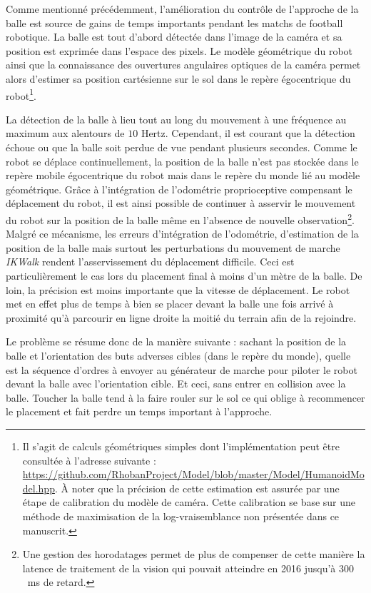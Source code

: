 Comme mentionné précédemment, l'amélioration du contrôle de l'approche 
de la balle est source de gains de temps importants pendant les
matchs de football robotique.
La balle est tout d'abord détectée dans l'image de la caméra 
et sa position est exprimée dans l'espace des pixels.
Le modèle géométrique du robot ainsi que la connaissance
des ouvertures angulaires optiques de la caméra permet alors d'estimer 
sa position cartésienne sur le sol dans le repère égocentrique 
du robot\footnote{Il s'agit de calculs géométriques simples dont l'implémentation
peut être consultée à l'adresse suivante :
\url{https://github.com/RhobanProject/Model/blob/master/Model/HumanoidModel.hpp}.
À noter que la précision de cette estimation est assurée par une 
étape de calibration du modèle de caméra. Cette calibration se base sur une
méthode de maximisation de la log-vraisemblance non présentée dans ce manuscrit.}.

La détection de la balle à lieu tout au long du mouvement à une fréquence au maximum 
aux alentours de $10$ Hertz. 
Cependant, il est courant que la détection échoue ou que la balle soit
perdue de vue pendant plusieurs secondes.
Comme le robot se déplace continuellement, la position de la balle 
n'est pas stockée dans le repère mobile égocentrique du robot mais dans 
le repère du monde lié au modèle géométrique.
Grâce à l'intégration de l'odométrie proprioceptive compensant 
le déplacement du robot, il est ainsi possible de continuer
à asservir le mouvement du robot sur la position de la balle même 
en l'absence de nouvelle observation\footnote{Une gestion des horodatages
permet de plus de compenser de cette manière la latence de traitement
de la vision qui pouvait atteindre en 2016 jusqu'à $300$~ms de retard.}.\\

Malgré ce mécanisme, les erreurs d'intégration de l'odométrie, 
d'estimation de la position de la balle mais surtout les perturbations
du mouvement de marche \textit{IKWalk} rendent l'asservissement 
du déplacement difficile.
Ceci est particulièrement le cas lors du placement final 
à moins d'un mètre de la balle.
De loin, la précision est moins importante que la vitesse de déplacement.
Le robot met en effet plus de temps à bien se placer devant la balle
une fois arrivé à proximité qu'à parcourir en ligne droite la moitié 
du terrain afin de la rejoindre.

Le problème se résume donc de la manière suivante : sachant la position 
de la balle et l'orientation des buts adverses cibles (dans le repère du monde), 
quelle est la séquence d'ordres à envoyer au générateur de marche pour piloter
le robot devant la balle avec l'orientation cible. 
Et ceci, sans entrer en collision avec la balle.
Toucher la balle tend à la faire rouler sur le sol ce qui oblige à
recommencer le placement et fait perdre un temps important à l'approche.\\

